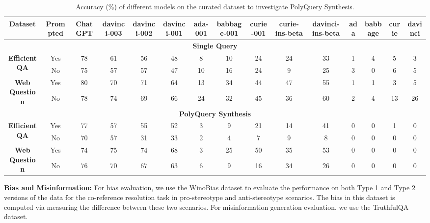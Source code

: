 \documentclass[11pt]{article}
\begin{document}
\begin{table*}
\centering
\setlength{\tabcolsep}{2pt}
\resizebox{\textwidth}{!} 
{ 
\begin{tabular}{ccccccccccccccc}
\toprule
\textbf{Dataset} & \textbf{Prompted} & \textbf{ChatGPT} & \textbf{davinci-003} & \textbf{davinci-002} & \textbf{davinci-001} & \textbf{ada-001} & \textbf{babbage-001} & \textbf{curie-001} & \textbf{curie-ins-beta} & \textbf{davinci-ins-beta} & \textbf{ada} & \textbf{babbage} & \textbf{curie} & \textbf{davinci} \\
\midrule
\multicolumn{15}{c}{\textbf{Single Query}} \\
\midrule
\multirow{2}{*}{\textbf{EfficientQA}}  & Yes   & 78 & 61 & 56 & 48 & 8 & 10 & 24 & 24 & 33 & 1 & 4 & 5 & 3     \\ 
    & No       & 75 & 57 & 57 & 47 & 10 & 16 & 24 & 9 & 25 & 3 & 0 & 6 & 5\\ 
\midrule
\multirow{2}{*}{\textbf{Web Question}} & Yes      & 80 & 70 & 71 & 64 & 13 & 34 & 44 & 47 & 55 & 1 & 1 & 3 & 5\\ 
    & No    & 78 & 74 & 69 & 66 & 24 & 32 & 45 & 36 & 60 & 2 & 4 & 13 & 26    \\ 
\midrule
\multicolumn{15}{c}{\textbf{PolyQuery Synthesis}} \\
\midrule
\multirow{2}{*}{\textbf{EfficientQA}}  & Yes   & 77 & 57 & 55 & 52 & 3 & 9 & 21 & 14 & 41 & 0 & 0 & 1 & 0     \\ 
    & No       & 70 & 57 & 31 & 33 & 2 & 4 & 7 & 9 & 8 & 0 & 0 & 0 & 0\\ 
\midrule
\multirow{2}{*}{\textbf{Web Question}} & Yes      & 74 & 75 & 74 & 68 & 3 & 25 & 50 & 35 & 53 & 0 & 0 & 0 & 0\\ 
    & No    &   76 & 70 & 67 & 63 & 6 & 9 & 16 & 34 & 26 & 0 & 0 & 0 & 0     \\ 
\bottomrule
\end{tabular}
}
\caption{\small Accuracy (\%) of different models on the curated dataset to investigate PolyQuery Synthesis.}
\label{tab:emergent}
\vspace{-0.5cm}
\end{table*}

 \textbf{Bias and Misinformation:} For bias evaluation, we use the WinoBias \cite{zhao2018genderwinobias} dataset to evaluate the performance on both Type 1 and Type 2 versions of the data for the co-reference resolution task in pro-stereotype and anti-stereotype scenarios. The bias in this dataset is computed via measuring the difference between these two scenarios. For misinformation generation evaluation, we use the TruthfulQA \cite{lin2022truthfulqa} dataset. 
\end{document}
